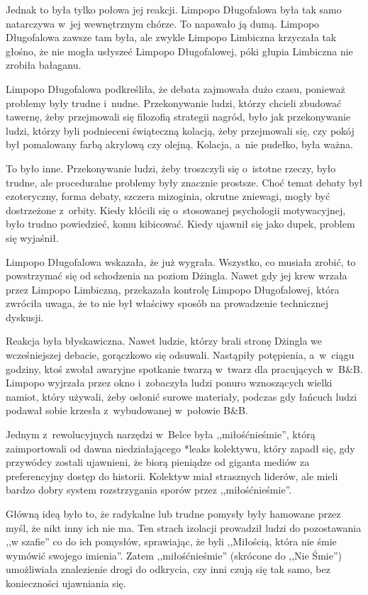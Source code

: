\documentclass[oneside,polish,11pt,sfheadings]{mwbk}
\begin{document}
Jednak to była tylko połowa jej reakcji. Limpopo Długofalowa była tak
samo natarczywa w~jej wewnętrznym chórze. To napawało ją dumą. Limpopo
Długofalowa zawsze tam była, ale zwykle Limpopo Limbiczna krzyczała tak
głośno, że nie mogła usłyszeć Limpopo Długofalowej, póki głupia
Limbiczna nie zrobiła bałaganu.

Limpopo Długofalowa podkreśliła, że debata zajmowała dużo czasu,
ponieważ problemy były trudne i~nudne. Przekonywanie ludzi, którzy
chcieli zbudować tawernę, żeby przejmowali się filozofią strategii
nagród, było jak przekonywanie ludzi, którzy byli podnieceni świąteczną
kolacją, żeby przejmowali się, czy pokój był pomalowany farbą akrylową
czy olejną. Kolacja, a~nie pudełko, była ważna.

To było inne. Przekonywanie ludzi, żeby troszczyli się o~istotne rzeczy,
było trudne, ale proceduralne problemy były znacznie prostsze. Choć
temat debaty był ezoteryczny, forma debaty, szczera mizoginia, okrutne
zniewagi, mogły być dostrzeżone z~orbity. Kiedy kłócili się o~stosowanej
psychologii motywacyjnej, było trudno powiedzieć, komu kibicować. Kiedy
ujawnił się jako dupek, problem się wyjaśnił.

Limpopo Długofalowa wskazała, że już wygrała. Wszystko, co musiała
zrobić, to powstrzymać się od schodzenia na poziom Dżingla. Nawet gdy
jej krew wrzała przez Limpopo Limbiczną, przekazała kontrolę Limpopo
Długofalowej, która zwróciła uwaga, że to nie był właściwy sposób na
prowadzenie technicznej dyskusji.

Reakcja była błyskawiczna. Nawet ludzie, którzy brali stronę Dżingla we
wcześniejszej debacie, gorączkowo się odsuwali. Nastąpiły potępienia, a~w~ciągu godziny, ktoś zwołał awaryjne spotkanie twarzą w~twarz dla
pracujących w~B\&B. Limpopo wyjrzała przez okno i~zobaczyła ludzi ponuro
wznoszących wielki namiot, który używali, żeby osłonić surowe materiały,
podczas gdy łańcuch ludzi podawał sobie krzesła z~wybudowanej w~połowie
B\&B.

Jednym z~rewolucyjnych narzędzi w~Belce była ,,miłośćnieśmie'', którą
zaimportowali od dawna niedziałającego *leaks kolektywu, który zapadł
się, gdy przywódcy zostali ujawnieni, że biorą pieniądze od giganta
mediów za preferencyjny dostęp do historii. Kolektyw miał strasznych
liderów, ale mieli bardzo dobry system rozstrzygania sporów przez
,,miłośćnieśmie''.

Główną ideą było to, że radykalne lub trudne pomysły były hamowane przez
myśl, że nikt inny ich nie ma. Ten strach izolacji prowadził ludzi do
pozostawania ,,w szafie'' co do ich pomysłów, sprawiając, że byli
,,Miłością, która nie śmie wymówić swojego imienia''. Zatem
,,miłośćnieśmie'' (skrócone do ,,Nie Śmie'') umożliwiała znalezienie
drogi do odkrycia, czy inni czują się tak samo, bez konieczności
ujawniania się.
\end{document}
